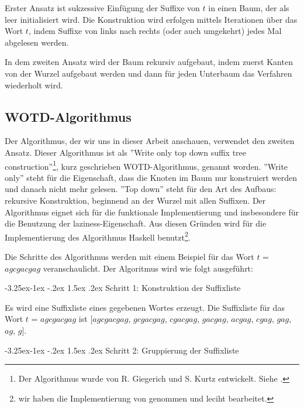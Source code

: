 \documentclass[12pt]{report}
\makeatletter
\renewcommand\paragraph{\@startsection{paragraph}{4}{\z@}%
    {-3.25ex\@plus -1ex \@minus -.2ex}%
    {1.5ex \@plus .2ex}%
    {\normalfont\normalsize\bfseries}}
\makeatother
\begin{document}
Erster Ansatz ist sukzessive Einfügung der Suffixe von $t$ in einen Baum, der als leer initialisiert wird. Die Konstruktion wird erfolgen mittels Iterationen über das Wort $t$, indem Suffixe von links nach rechts (oder auch umgekehrt) jedes Mal abgelesen werden.

In dem zweiten Ansatz wird der Baum rekursiv aufgebaut, indem zuerst Kanten von der Wurzel aufgebaut werden und dann für jeden Unterbaum das Verfahren wiederholt wird.

\subsection{WOTD-Algorithmus}
\label{sec:WOTDAlgorithmus}

Der Algorithmus, der wir uns in dieser Arbeit anschauen, verwendet den zweiten Ansatz. Dieser Algorithmus ist als ''Write only top down suffix tree construction''\footnote{Der Algorithmus wurde von R. Giegerich und S. Kurtz entwickelt. Siehe \cite{Giegerich1995}.}, kurz geschrieben WOTD-Algorithmus, genannt worden. ''Write only'' steht für die Eigenschaft, dass die Knoten im Baum nur konstruiert werden und danach nicht mehr gelesen. ''Top down'' steht für den Art des Aufbaus: rekursive Konstruktion, beginnend an der Wurzel mit allen Suffixen. Der Algorithmus eignet sich für die funktionale Implementierung und insbesondere für die Benutzung der laziness-Eigenschaft. Aus diesen Gründen wird für die Implementierung des Algorithmus Haskell benutzt\footnote{wir haben die Implementierung von \cite{Giegerich1995} genommen und leciht bearbeitet.}.

Die Schritte des Algorithmus werden mit einem Beispiel für das Wort $t$ = $agcgacgag$ veranschaulicht. Der Algoritmus wird wie folgt ausgeführt:

\paragraph{Schritt 1: Konstruktion der Suffixliste}

Es wird eine Suffixliste eines gegebenen Wortes erzeugt. Die Suffixliste für das Wort $t$ = $agcgacgag$ ist
$[agcgacgag$, $gcgacgag$, $cgacgag$, $gacgag$, $acgag$, $cgag$, $gag$, $ag$, $g]$.

\paragraph{Schritt 2: Gruppierung der Suffixliste}
\end{document}
